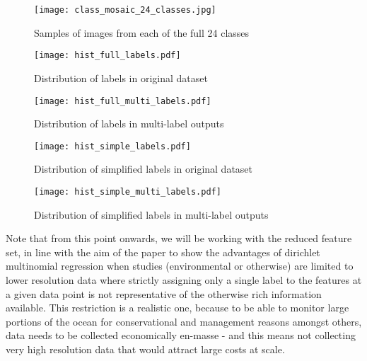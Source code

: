 \begin{figure}
    \texttt{[image: class\_mosaic\_24\_classes.jpg]}
    \caption{Samples of images from each of the full 24 classes }
    \label{fig:24classes}
\end{figure}

\begin{figure}[H]
    \begin{minipage}{.47\linewidth}
        \texttt{[image: hist\_full\_labels.pdf]}
        \caption{Distribution of labels in original dataset}
        \label{fig:singlelabeldistr}
    \end{minipage}
    \hfill
    \begin{minipage}{.47\linewidth}
        \texttt{[image: hist\_full\_multi\_labels.pdf]}
        \caption{Distribution of labels in multi-label outputs}
        \label{fig:multilabeldistr}
    \end{minipage}
\end{figure}

\begin{figure}[H]
    \begin{minipage}{.47\linewidth}
        \texttt{[image: hist\_simple\_labels.pdf]}
        \caption{Distribution of simplified labels in original dataset}
        \label{fig:singlelabeldistr}
    \end{minipage}
    \hfill
    \begin{minipage}{.47\linewidth}
        \texttt{[image: hist\_simple\_multi\_labels.pdf]}
        \caption{Distribution of simplified labels in multi-label outputs}
        \label{fig:multilabeldistr}
    \end{minipage}
\end{figure}

Note that from this point onwards, we will be working with the reduced feature set, in line with the aim of the paper to show the advantages of dirichlet multinomial regression when studies (environmental or otherwise) are limited to lower resolution data where strictly assigning only a single label to the features at a given data point is not representative of the otherwise rich information available. This restriction is a realistic one, because to be able to monitor large portions of the ocean for conservational and management reasons amongst others, data needs to be collected economically en-masse - and this means not collecting very high resolution data that would attract large costs at scale.

